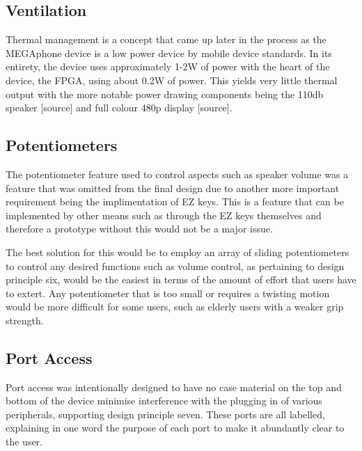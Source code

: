 \subsection{Ventilation} %

Thermal management is a concept that came up later in the process as the MEGAphone device is a low power device by mobile device standards.
In its entirety, the device uses approximately 1-2W of power with the heart of the device, the FPGA, using about 0.2W of power.
This yields very little thermal output with the more notable power drawing components being the 110db speaker [source] and full colour 480p display [source].

\subsection{Potentiometers}

The potentiometer feature used to control aspects such as speaker volume was a feature that was omitted from the final design due to another more important requirement being the implimentation of EZ keys.
This is a feature that can be implemented by other means such as through the EZ keys themselves and therefore a prototype without this would not be a major issue.

The best solution for this would be to employ an array of sliding potentiometers to control any desired functions such as volume control, as pertaining to design principle six, would be the easiest in terms of the amount of effort that users have to extert.
Any potentiometer that is too small or requires a twisting motion would be more difficult for some users, such as elderly users with a weaker grip strength.

\subsection{Port Access}

Port access was intentionally designed to have no case material on the top and bottom of the device minimise interference with the plugging in of various peripherals, supporting design principle seven.
These ports are all labelled, explaining in one word the purpose of each port to make it abundantly clear to the user.

